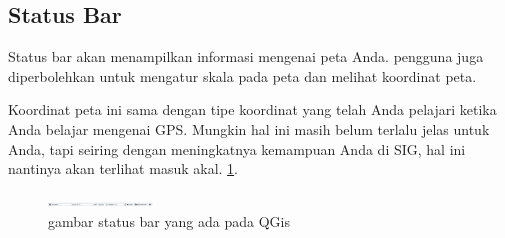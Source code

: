 \subsection{Status Bar}
Status bar akan menampilkan informasi mengenai peta Anda. pengguna juga diperbolehkan untuk mengatur skala pada peta dan melihat koordinat peta.

Koordinat peta ini sama dengan tipe koordinat yang telah Anda pelajari ketika Anda belajar mengenai GPS.
Mungkin hal ini masih belum terlalu jelas untuk Anda, tapi seiring dengan meningkatnya kemampuan Anda di SIG, hal ini nantinya akan terlihat masuk akal. \ref{statbar}.
\begin{figure}[ht]
    \centerline{\includegraphics[width=0.25\textwidth]{figures/statbar}}
    \caption{gambar status bar yang ada pada QGis}
    \label{statbar}
    \end{figure}

